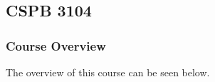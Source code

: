 \clearpage

\renewcommand{\ChapTitle}{\CSPBAlgo}
\renewcommand{\SectionTitle}{CSPB 3104}

\chapter{\ChapTitle}
\section{\SectionTitle}

\subsection{Course Overview}

The overview of this course can be seen below.

